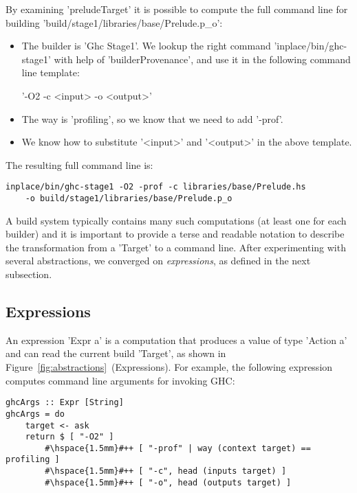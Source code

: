 \noindent By examining \lst'preludeTarget' it is possible to compute the full
command line for building \lst'build/stage1/libraries/base/Prelude.p_o':
\begin{itemize}
  \item The builder is \lst'Ghc Stage1'. We lookup the right command
  \lst'inplace/bin/ghc-stage1' with help of \lst'builderProvenance', and use it
  in the following command line template:\vspace{1mm}\\
  \centerline{\!\!\!\!\!\lst'-O2 -c <input> -o <output>'}
  \item The way is \lst'profiling', so we know that we need to add
  \lst'-prof'.
  \item We know how to substitute \lst'<input>' and \lst'<output>' in the
  above template.
\end{itemize}

\noindent The resulting full command line is:
\begin{lstlisting}
inplace/bin/ghc-stage1 -O2 -prof -c libraries/base/Prelude.hs
    -o build/stage1/libraries/base/Prelude.p_o
\end{lstlisting}

A build system typically contains many such computations (at least one
for each builder) and it is important to provide a terse and readable notation to
describe the transformation from a \lst'Target' to a command line. After
experimenting with several abstractions, we converged on \emph{expressions}, as
defined in the next subsection.

\subsection{Expressions\label{sec:expressions}}

An expression \lst'Expr a' is a computation that produces a value of type
\lst'Action a' and can read the current build \lst'Target', as shown in
Figure~\ref{fig:abstractions}~(Expressions). For example,
the following expression computes command line arguments for invoking GHC:

\newcommand{\altab}[1]{\hspace{.05\textwidth}\rlap{#1}}

\begin{lstlisting}
ghcArgs :: Expr [String]
ghcArgs = do
    target <- ask
    return $ [ "-O2" ]
        #\hspace{1.5mm}#++ [ "-prof" | way (context target) == profiling ]
        #\hspace{1.5mm}#++ [ "-c", head (inputs target) ]
        #\hspace{1.5mm}#++ [ "-o", head (outputs target) ]
\end{lstlisting}

